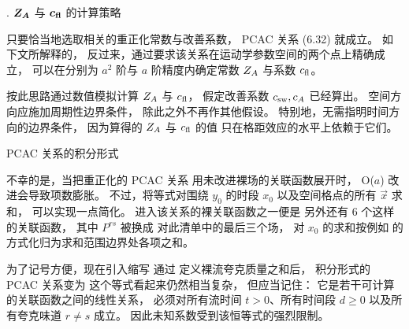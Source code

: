 
. $\boldsymbol{Z_A}$ 与 ${\boldsymbol c}_{\bf fl}$ 的计算策略

只要恰当地选取相关的重正化常数与改善系数，
PCAC 关系 (6.32) 就成立。
如下文所解释的，
反过来，通过要求该关系在运动学参数空间的两个点上精确成立，
可以在分别为 $a^2$ 阶与 $a$ 阶精度内确定常数 $Z_A$
与系数 $c_{\rm fl}$。

按此思路通过数值模拟计算 $Z_A$ 与 $c_{\rm fl}$，
假定改善系数 $c_{\rm sw},c_A$ 已经算出。
空间方向应施加周期性边界条件，
除此之外不再作其他假设。
特别地，无需指明时间方向的边界条件，
因为算得的 $Z_A$ 与 $c_{\rm fl}$ 的值
只在格距效应的水平上依赖于它们。


 PCAC 关系的积分形式

不幸的是，当把重正化的 PCAC 关系
用未改进裸场的关联函数展开时，
O($a$) 改进会导致项数膨胀。
不过，将等式对围绕 $y_0$ 的时段 $x_0$
以及空间格点的所有 $\vec{x}$ 求和，
可以实现一点简化。
进入该关系的裸关联函数之一便是
另外还有 $6$ 个这样的关联函数，
其中 $P^{rs}$ 被换成
对此清单中的最后三个场，
对 $x_0$ 的求和按例如
的方式化归为求和范围边界处各项之和。

为了记号方便，现在引入缩写
通过
定义裸流夸克质量之和后，
积分形式的 PCAC 关系变为
这个等式看起来仍然相当复杂，
但应当记住：
它是若干可计算的关联函数之间的线性关系，
必须对所有流时间 $t>0$、所有时间段 $d\geq0$
以及所有夸克味道 $r\neq s$ 成立。
因此未知系数受到该恒等式的强烈限制。

